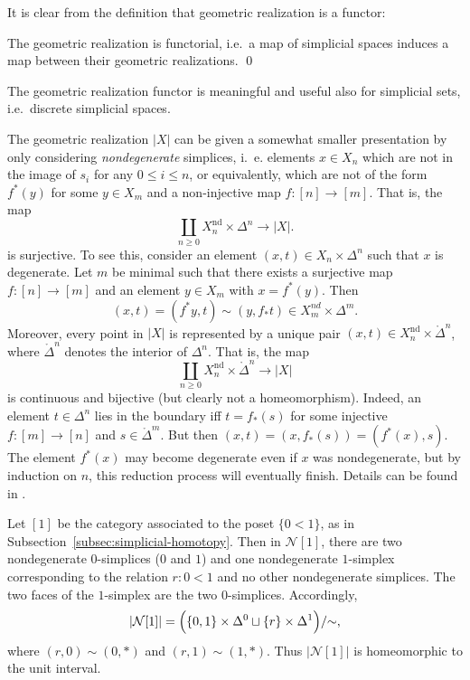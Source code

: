 \documentclass[a4paper,openany]{scrbook}
\newcommand{\nerve}{\mathcal N}
\begin{document}
It is clear from the definition that geometric realization is a functor:

\begin{lemma}
The geometric realization is functorial, i.e.\ a map of simplicial spaces induces a map between their geometric realizations. \qed
\end{lemma}

\begin{remark}
The geometric realization functor is meaningful and useful also for simplicial sets, i.e.\ discrete simplicial spaces.
\end{remark}

The geometric realization $|X|$ can be given a somewhat smaller presentation by only considering \emph{nondegenerate} simplices, i.~e. elements $x \in X_n$ which are not in the image of $s_i$ for any $0 \leq i \leq n$, or equivalently, which are not of the form $f^*(y)$ for some $y \in X_m$ and a non-injective map $f\colon [n] \to [m]$. That is, the map 
\begin{equation}\label{eq:realizationwithnondegenerates}
\coprod_{n \geq 0} X^{\operatorname{nd}}_n \times \Delta^n \to |X|.
\end{equation}
is surjective. To see this, consider an element $(x,t) \in X_n \times \Delta^n$ such that $x$ is degenerate. Let $m$ be minimal such that there exists a surjective map $f\colon [n] \to [m]$ and an element $y \in X_m$ with $x = f^*(y)$. Then
\[
(x,t)=(f^*y,t) \sim (y,f_*t) \in X_m^{nd} \times \Delta^m.
\]
Moreover, every point in $|X|$ is represented by a unique pair $(x,t) \in X^{\operatorname{nd}}_n \times \mathring\Delta^n$, where $\mathring\Delta^n$ denotes the interior of $\Delta^n$. That is, the map
\[
\coprod_{n \geq 0} X^{\operatorname{nd}}_n \times \mathring \Delta^n \to |X|
\]
is continuous and bijective (but clearly not a homeomorphism). Indeed, an element $t \in \Delta^n$ lies in the boundary iff $t = f_*(s)$ for some injective $f\colon [m] \to [n]$ and $s \in \mathring \Delta^m$. But then $(x,t) = (x,f_*(s))=(f^*(x),s)$. The element $f^*(x)$ may become degenerate even if $x$ was nondegenerate, but by induction on $n$, this reduction process will eventually finish. Details can be found in \cite{milnor:57}.

\begin{example}\label{exa:geomrealizationofinterval}
Let $[1]$ be the category associated to the poset $\{0 < 1\}$, as in Subsection~\ref{subsec:simplicial-homotopy}. Then in $\nerve [1]$, there are two nondegenerate $0$-simplices ($0$ and $1$) and one nondegenerate $1$-simplex corresponding to the relation $r\colon 0 < 1$ and no other nondegenerate simplices. The two faces of the $1$-simplex are the two $0$-simplices. Accordingly,
\[
|\nerve [1]| = \Bigl(\{0,1\} \times \Delta^0 \sqcup \{r\} \times \Delta^1\Bigr)/\mathord{\sim},
\]
where $(r,0) \sim (0,*)$ and $(r,1) \sim (1,*)$. Thus $|\nerve [1]|$ is homeomorphic to the unit interval.
\end{example}
\end{document}
